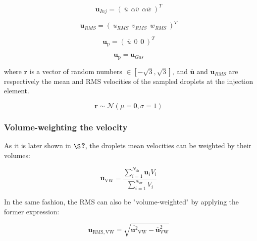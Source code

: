 \begin{equation}
\boldsymbol{u}_{Inj} = \left( ~ \overline{u} ~~ \alpha \overline{v} ~~ \alpha \overline{w} ~ \right)^T
\end{equation}


\begin{equation}
\boldsymbol{u}_{RMS}= \left( ~ u_{RMS} ~~ v_{RMS} ~~ w_{RMS} ~ \right)^T
\end{equation}

\begin{equation}
\boldsymbol{u}_\mathrm{p} = \left( ~ \overline{u} ~~ 0 ~~ 0 ~ \right)^T
\end{equation}

\begin{equation}
\boldsymbol{u}_\mathrm{p}= \boldsymbol{u}_{Gas}
\end{equation}

where $\boldsymbol{r}$ is a vector of random numbers $\in [-\sqrt{3}, \sqrt{3}]$, and $\overline{\boldsymbol{u}}$ and $\boldsymbol{u}_{RMS}$ are respectively the mean and RMS velocities of the sampled droplets at the injection element.

\begin{equation}
\boldsymbol{r} \sim \mathcal{N} \left( \mu = 0, \sigma = 1 \right)
\end{equation}

\subsubsection*{Volume-weighting the velocity}

As it is later shown in $\S$\textbf{?}, the droplets mean velocities can be weighted by their volumes:


\begin{equation}
\displaystyle \overline{ \textbf{u} }_\mathrm{VW} = \frac{\sum_{i=1}^{N_\mathrm{dr}} \textbf{u}_i V_i}{\sum_{i=1}^{N_\mathrm{dr}} V_i}
\end{equation}

In the same fashion, the RMS can also be "volume-weighted" by applying the former expression:

\begin{equation}
\textbf{u}_\mathrm{RMS,VW} = \sqrt{\displaystyle \overline{\textbf{u}^2 }_\mathrm{VW} - \displaystyle \overline{\textbf{u} }_\mathrm{VW}^2}
\end{equation}

